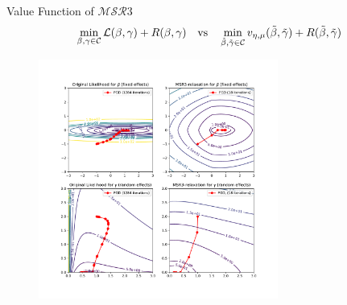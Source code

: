 \documentclass[8pt]{beamer}
\begin{document}



\begin{frame}{Value Function of $\mathcal{MSR}3$}
\[
	\min_{\beta, \gamma \in \mathcal{C}} \operatorname{\mathcal{L}}(\beta, \gamma) + R(\beta, \gamma) \quad \text{vs} \quad \min_{\tilde\beta, \tilde\gamma \in \mathcal{C}} v_{\eta,\mu}(\tilde\beta, \tilde\gamma) + R(\tilde\beta, \tilde\gamma)
\]

\begin{figure}
	\includegraphics[width=0.7\textwidth]{Figures/intuition_current.pdf}
	\label{fig:intuition_sr3}
\end{figure}
\end{frame}
\end{document}
